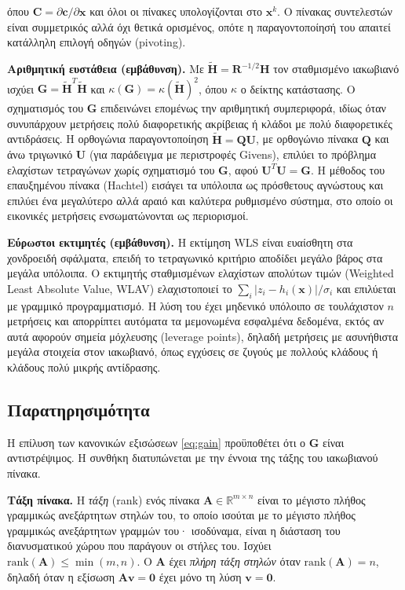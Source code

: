 όπου $\mathbf{C} = \partial\mathbf{c}/\partial\mathbf{x}$ και όλοι οι πίνακες υπολογίζονται στο
$\mathbf{x}^{k}$. Ο πίνακας συντελεστών είναι συμμετρικός αλλά όχι θετικά ορισμένος, οπότε η
παραγοντοποίησή του απαιτεί κατάλληλη επιλογή οδηγών (pivoting).

\textbf{Αριθμητική ευστάθεια (εμβάθυνση).} Με $\tilde{\mathbf{H}} = \mathbf{R}^{-1/2}\mathbf{H}$ τον
σταθμισμένο ιακωβιανό ισχύει $\mathbf{G} = \tilde{\mathbf{H}}^{T}\tilde{\mathbf{H}}$ και
$\kappa(\mathbf{G}) = \kappa(\tilde{\mathbf{H}})^2$, όπου $\kappa$ ο δείκτης κατάστασης. Ο
σχηματισμός του $\mathbf{G}$ επιδεινώνει επομένως την αριθμητική συμπεριφορά, ιδίως όταν
συνυπάρχουν μετρήσεις πολύ διαφορετικής ακρίβειας ή κλάδοι με πολύ διαφορετικές αντιδράσεις.
Η ορθογώνια παραγοντοποίηση $\tilde{\mathbf{H}} = \mathbf{Q}\mathbf{U}$, με ορθογώνιο πίνακα
$\mathbf{Q}$ και άνω τριγωνικό $\mathbf{U}$ (για παράδειγμα με περιστροφές Givens), επιλύει το
πρόβλημα ελαχίστων τετραγώνων χωρίς σχηματισμό του $\mathbf{G}$, αφού
$\mathbf{U}^{T}\mathbf{U} = \mathbf{G}$. Η μέθοδος του επαυξημένου πίνακα (Hachtel) εισάγει τα
υπόλοιπα ως πρόσθετους αγνώστους και επιλύει ένα μεγαλύτερο αλλά αραιό και καλύτερα
ρυθμισμένο σύστημα, στο οποίο οι εικονικές μετρήσεις ενσωματώνονται ως περιορισμοί.

\textbf{Εύρωστοι εκτιμητές (εμβάθυνση).} Η εκτίμηση WLS είναι ευαίσθητη στα χονδροειδή σφάλματα, επειδή
το τετραγωνικό κριτήριο αποδίδει μεγάλο βάρος στα μεγάλα υπόλοιπα. Ο εκτιμητής σταθμισμένων
ελαχίστων απολύτων τιμών (Weighted Least Absolute Value, WLAV) ελαχιστοποιεί το
$\sum_{i} |z_i - h_i(\mathbf{x})|/\sigma_i$ και επιλύεται με γραμμικό προγραμματισμό. Η λύση του έχει μηδενικό υπόλοιπο σε τουλάχιστον $n$ μετρήσεις και απορρίπτει αυτόματα τα μεμονωμένα εσφαλμένα
δεδομένα, εκτός αν αυτά αφορούν σημεία μόχλευσης (leverage points), δηλαδή μετρήσεις με
ασυνήθιστα μεγάλα στοιχεία στον ιακωβιανό, όπως εγχύσεις σε ζυγούς με πολλούς κλάδους ή
κλάδους πολύ μικρής αντίδρασης.

\subsection{Παρατηρησιμότητα}
\label{sec:observability}

Η επίλυση των κανονικών εξισώσεων \eqref{eq:gain} προϋποθέτει ότι ο $\mathbf{G}$ είναι
αντιστρέψιμος. Η συνθήκη διατυπώνεται με την έννοια της τάξης του ιακωβιανού πίνακα.

\textbf{Τάξη πίνακα.} Η \emph{τάξη} (rank) ενός πίνακα $\mathbf{A} \in \mathbb{R}^{m \times n}$
είναι το μέγιστο πλήθος γραμμικώς ανεξάρτητων στηλών του, το οποίο ισούται με το μέγιστο
πλήθος γραμμικώς ανεξάρτητων γραμμών του· ισοδύναμα, είναι η διάσταση του διανυσματικού χώρου
που παράγουν οι στήλες του. Ισχύει $\mathrm{rank}(\mathbf{A}) \le \min(m, n)$. Ο $\mathbf{A}$
έχει \emph{πλήρη τάξη στηλών} όταν $\mathrm{rank}(\mathbf{A}) = n$, δηλαδή όταν η εξίσωση
$\mathbf{A}\mathbf{v} = \mathbf{0}$ έχει μόνο τη λύση $\mathbf{v} = \mathbf{0}$.

